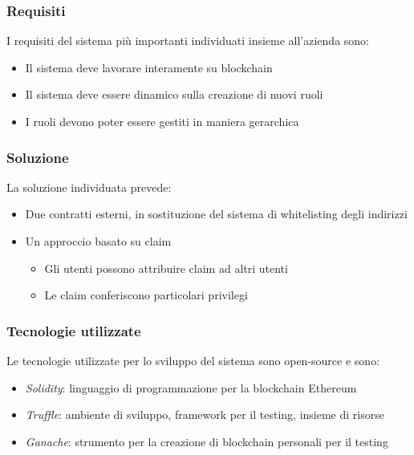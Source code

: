 \documentclass{beamer}
\begin{document}

\begin{frame}
\frametitle{Requisiti}
I requisiti del sistema più importanti individuati insieme all'azienda sono:

\begin{itemize}
    \item Il sistema deve lavorare interamente su blockchain
    \item Il sistema deve essere dinamico sulla creazione di nuovi ruoli
    \item I ruoli devono poter essere gestiti in maniera gerarchica
\end{itemize}

\end{frame}


\begin{frame}
\frametitle{Soluzione}

La soluzione individuata prevede:
\begin{itemize}
    \item Due contratti esterni, in sostituzione del sistema di whitelisting degli indirizzi
    \item Un approccio basato su claim
    \begin{itemize}
        \item Gli utenti possono attribuire claim ad altri utenti
        \item Le claim conferiscono particolari privilegi
    \end{itemize}
\end{itemize}

\end{frame}


\begin{frame}
\frametitle{Tecnologie utilizzate}

Le tecnologie utilizzate per lo sviluppo del sistema sono open-source e sono:

\begin{itemize}
    \item \emph{Solidity}: linguaggio di programmazione per la blockchain Ethereum
    \item \emph{Truffle}: ambiente di sviluppo, framework per il testing, insieme di risorse
    \item \emph{Ganache}: strumento per la creazione di blockchain personali per il testing
\end{itemize}

\end{frame}
\end{document}
